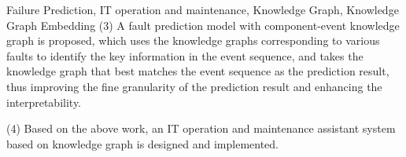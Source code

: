 \begin{englishabstract}{Failure Prediction, IT operation and maintenance, Knowledge Graph, Knowledge Graph Embedding}
(3) A fault prediction model with component-event knowledge graph is proposed, which uses the knowledge graphs corresponding to various faults to identify the key information in the event sequence, and takes the knowledge graph that best matches the event sequence as the prediction result, thus improving the fine granularity of the prediction result and enhancing the interpretability.

(4) Based on the above work, an IT operation and maintenance assistant system based on knowledge graph is designed and implemented.

\end{englishabstract}
\tableofcontents
\listofothers









